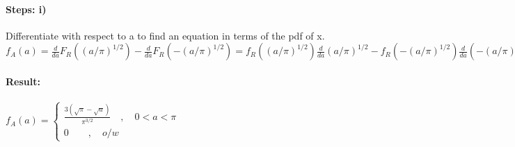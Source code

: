 \paragraph{Steps: i)} Differentiate with respect to a to find an equation in terms of the pdf of x.\\ $f_A(a)=\frac{d}{da} F_R\left((a/\pi)^{1/2}\right) - \frac{d}{da} F_R\left(-(a/\pi)^{1/2}\right) = f_R\left((a/\pi)^{1/2}\right) \frac{d}{da}(a/\pi)^{1/2} - f_R\left(-(a/\pi)^{1/2}\right)\frac{d}{da}\left(-(a/\pi)^{1/2}\right)$


\paragraph{Result:} $f_A(a)=\begin{cases} \frac{ 3(\sqrt{\pi}-\sqrt{a})}{\pi^{3/2}} \quad ,\quad 0<a<\pi \\ 0\quad  \quad ,\quad o/w \end{cases}$
